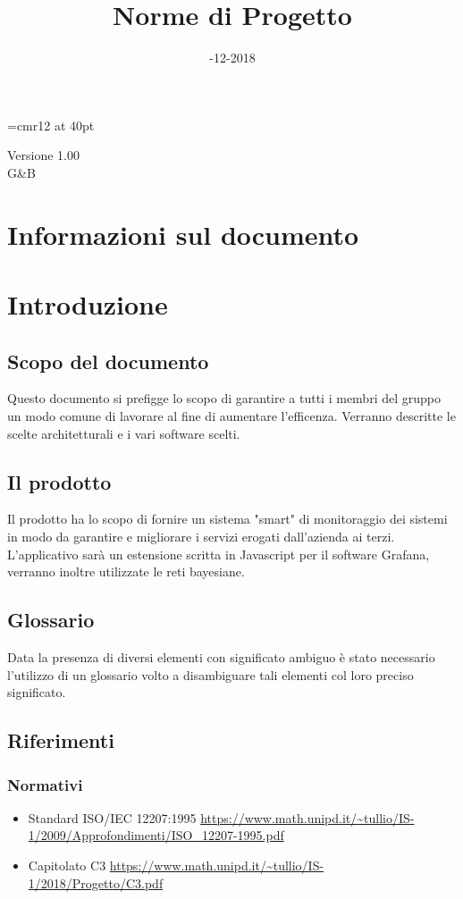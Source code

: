 


\title{\myfont Norme di Progetto}
\font\myfont=cmr12 at 40pt
\date{-12-2018}


  \maketitle
  \begin{center}
  \huge Versione 1.00 
  \\G\&B
  \end{center}
  \newpage
  \tableofcontents
  \newpage

\section*{Informazioni sul documento}


\section{Introduzione}
\subsection{Scopo del documento}
Questo documento si prefigge lo scopo di garantire a tutti i membri del gruppo un modo comune di lavorare al fine di aumentare l'efficenza. Verranno descritte le scelte architetturali e i vari software scelti.
\subsection{Il prodotto}
Il prodotto ha lo scopo di fornire un sistema "smart" di monitoraggio dei sistemi in modo da garantire e migliorare i servizi erogati dall'azienda ai terzi. L'applicativo sarà un estensione scritta in Javascript per il software Grafana, verranno inoltre utilizzate le reti bayesiane.
\subsection{Glossario}
Data la presenza di diversi elementi con significato ambiguo è stato necessario l'utilizzo di un glossario volto a disambiguare tali elementi col loro preciso significato.
\subsection{Riferimenti}
\subsubsection{Normativi}
\begin{itemize}
\item Standard ISO/IEC 12207:1995 \newline \url{https://www.math.unipd.it/~tullio/IS-1/2009/Approfondimenti/ISO_12207-1995.pdf}
\item Capitolato C3 \newline \url{https://www.math.unipd.it/~tullio/IS-1/2018/Progetto/C3.pdf}
\end{itemize}
